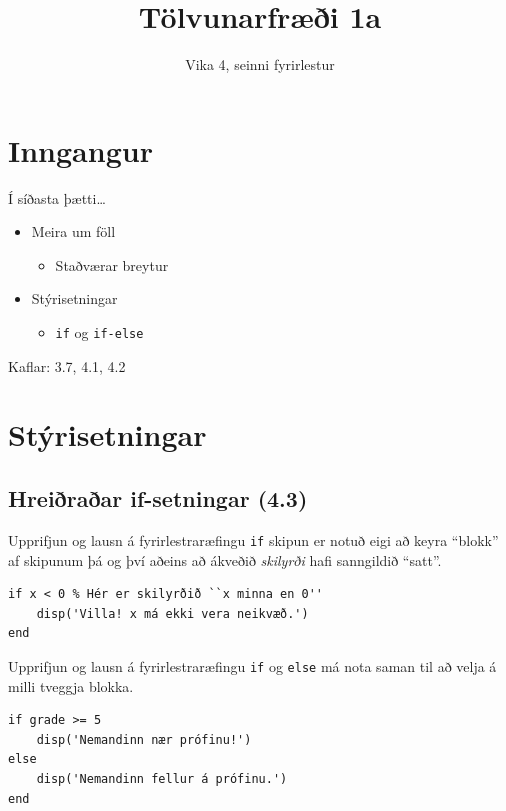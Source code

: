 \documentclass{beamer}
\title{Tölvunarfræði 1a}
\subtitle{Vika 4, seinni fyrirlestur}
\begin{document}
\begin{frame}
\titlepage
\end{frame}

\section{Inngangur}


\begin{frame}{Í síðasta þætti\ldots}
\begin{itemize}
 \item Meira um föll
 \begin{itemize}
  \item Staðværar breytur
 \end{itemize}
 \item Stýrisetningar
 \begin{itemize}
  \item \texttt{if} og \texttt{if-else}
 \end{itemize}
\end{itemize}
Kaflar: 3.7, 4.1, 4.2
\end{frame}

\section{Stýrisetningar}
\subsection{Hreiðraðar if-setningar (4.3)}

\begin{frame}[fragile]{Upprifjun og lausn á fyrirlestraræfingu}
\texttt{if} skipun er notuð eigi að keyra ``blokk'' af skipunum þá og því aðeins að ákveðið \emph{skilyrði} hafi sanngildið ``satt''.
\begin{verbatim}
if x < 0 % Hér er skilyrðið ``x minna en 0''
    disp('Villa! x má ekki vera neikvæð.')
end
\end{verbatim}
\end{frame}

\begin{frame}[fragile]{Upprifjun og lausn á fyrirlestraræfingu}
\texttt{if} og \texttt{else} má nota saman til að velja á milli tveggja blokka.
\begin{verbatim}
if grade >= 5
    disp('Nemandinn nær prófinu!')
else
    disp('Nemandinn fellur á prófinu.')
end
\end{verbatim}
\end{frame}
\end{document}
